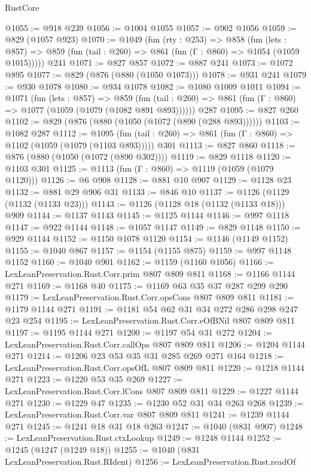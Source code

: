 \begin{lexlean}{RustCore}
\begin{coremodule}
@1055 := @918 @239
@1056 := @1004 @1055
@1057 := @902 @1056
@1059 := @829 (@1057 @923)
@1070 := @1049
    (fun (rty : @253) =>
    @858
      (fun (lets : @857) =>
      @859 (fun (tail : @260) => @861 (fun (Γ : @860) => @1054 (@1059 @1015)))))
    @241
@1071 := @827 @857
@1072 := @887 @241
@1073 := @1072 @895
@1077 := @829 (@876 (@880 (@1050 @1073)))
@1078 := @931 @241
@1079 := @930 @1078
@1080 := @934 @1078
@1082 := @1080 @1009 @1011
@1094 := @1071
    (fun (lets : @857) =>
    @859 (fun (tail : @260) => @861 (fun (Γ : @860) => @1077 (@1059 (@1079 (@1082 @891 @893))))))
    @287
@1095 := @827 @260
@1102 := @829 (@876 (@880 (@1050 (@1072 (@890 (@288 @893))))))
@1103 := @1082 @287
@1112 := @1095
    (fun (tail : @260) => @861 (fun (Γ : @860) => @1102 (@1059 (@1079 (@1103 @893)))))
    @301
@1113 := @827 @860
@1118 := @876 (@880 (@1050 (@1072 (@890 @302))))
@1119 := @829 @1118
@1120 := @1103 @301
@1125 := @1113 (fun (Γ : @860) => @1119 (@1059 (@1079 @1120)))
@1126 := @6 @908
@1128 := @881 @10 @907
@1129 := @1128 @23
@1132 := @881 @29 @906 @31
@1133 := @846 @10
@1137 := @1126 (@1129 (@1132 (@1133 @23)))
@1143 := @1126 (@1128 @18 (@1132 (@1133 @18))) @909
@1144 := @1137 @1143
@1145 := @1125 @1144
@1146 := @997 @1118
@1147 := @922 @1144
@1148 := @1057 @1147
@1149 := @829 @1148
@1150 := @929 @1144
@1152 := @1150 @1078 @1120
@1154 := @1146 (@1149 @1152)
@1155 := @1040 @867
@1157 := @1154 (@1155 @875)
@1159 := @997 @1148 @1152
@1160 := @1040 @901
@1162 := @1159 (@1160 @1056)
@1166 := LexLeanPreservation.Rust.Corr.prim @807 @809 @811
@1168 := @1166 @1144 @271
@1169 := @1168 @40
@1175 := @1169 @63 @35 @37 @287 @299 @290
@1179 := LexLeanPreservation.Rust.Corr.opsCons @807 @809 @811
@1181 := @1179 @1144 @271
@1191 := @1181 @54 @62 @31 @34 @272 @286 @298 @247 @23 @254
@1195 := LexLeanPreservation.Rust.Corr.eOfBNil @807 @809 @811
@1197 := @1195 @1144 @271
@1200 := @1197 @54 @31 @272
@1204 := LexLeanPreservation.Rust.Corr.callOps @807 @809 @811
@1206 := @1204 @1144 @271
@1214 := @1206 @23 @53 @35 @31 @285 @269 @271 @164
@1218 := LexLeanPreservation.Rust.Corr.opsOfL @807 @809 @811
@1220 := @1218 @1144 @271
@1223 := @1220 @53 @35 @269
@1227 := LexLeanPreservation.Rust.Corr.lCons @807 @809 @811
@1229 := @1227 @1144 @271
@1230 := @1229 @47
@1235 := @1230 @52 @31 @34 @263 @268
@1239 := LexLeanPreservation.Rust.Corr.var @807 @809 @811
@1241 := @1239 @1144 @271
@1245 := @1241 @18 @31 @18 @263
@1247 := @1040 (@831 @907)
@1248 := LexLeanPreservation.Rust.ctxLookup
@1249 := @1248 @1144
@1252 := @1245 (@1247 (@1249 @18))
@1255 := @1040 (@831 LexLeanPreservation.Rust.RIdent)
@1256 := LexLeanPreservation.Rust.readOf

\end{coremodule}
\end{lexlean}

